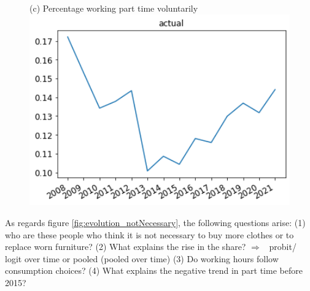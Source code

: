 \documentclass[12pt]{article}
\newcommand{\ar}{$\Rightarrow$ \ }
\begin{document}
\begin{figure}[h!!]
\begin{minipage}[h!!]{0.32\textwidth}
	\end{minipage}
	\begin{minipage}[h!!]{0.32\textwidth}  
	\centering\footnotesize{(c) Percentage working part time voluntarily\\ }
	\includegraphics[width=1\textwidth]{../codding_data/results/liss/total_share_voluntary_work_reduction_actual.png}
\end{minipage}
\end{figure}

As regards figure \ref{fig:evolution_notNecessary}, the following questions arise: 
(1) who are these people who think it is not necessary to buy more clothes or to replace worn furniture?
(2) What explains the rise in the share? \ar probit/ logit over time or pooled (pooled over time)
(3) Do working hours follow consumption choices? 
(4) What explains the negative trend in part time before 2015? 
\end{document}
